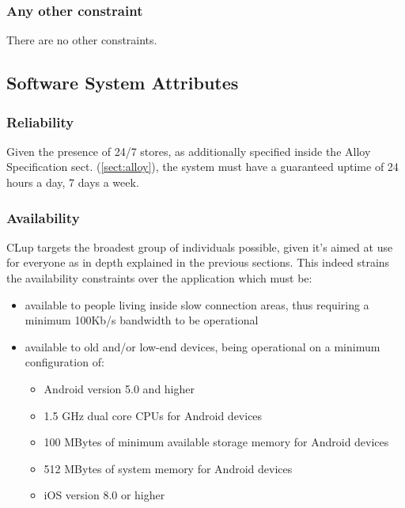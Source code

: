 \subsubsection{Any other constraint}
There are no other constraints.

\subsection{Software System Attributes}

\subsubsection{Reliability}
Given the presence of 24/7 stores, as additionally specified inside the Alloy Specification sect. (\ref{sect:alloy}), the system must have a guaranteed uptime of 24 hours a day, 7 days a week.
\subsubsection{Availability}
CLup targets the broadest group of individuals possible, given it's aimed at use for everyone as in depth explained in the previous sections. This indeed strains the availability constraints over the application which must be:\newline
\begin{itemize}
    \item available to people living inside slow connection areas, thus requiring a minimum 100Kb/s bandwidth to be operational
    \item available to old and/or low-end devices, being operational on a minimum configuration of:
    \begin{itemize}
        \item Android version 5.0 and higher
        \item 1.5 GHz dual core CPUs for Android devices
        \item 100 MBytes of minimum available storage memory for Android devices
        \item 512 MBytes of system memory for Android devices
        \item iOS version 8.0 or higher
    \end{itemize}
\end{itemize}

